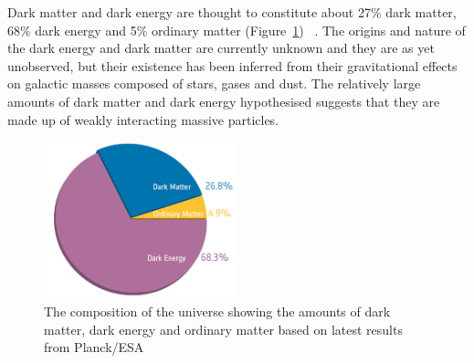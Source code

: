Dark matter and dark energy are thought to constitute about 27\% dark matter, 68\% dark energy and 5\%
ordinary matter (Figure~\ref{fig:universe_composition}) ~\cite{Ade:2013sjv}. The origins and nature of the
dark energy and dark matter are currently unknown and they are as yet unobserved, but their existence has been
inferred from their gravitational effects on galactic masses composed of stars, gases and dust. The relatively
large amounts of dark matter and dark energy hypothesised suggests that they are made up of weakly interacting
massive particles.

\begin{figure}[hbtp]
   \centering
     \includegraphics[width=0.5\textwidth]{Chapters/03_Theory/Images/planck_cosmic_pie}\hfill
     \caption[The composition of the universe showing the amounts of dark matter, dark energy and ordinary
     matter.]{The composition of the universe showing the amounts of dark matter, dark energy and ordinary
     matter based on latest results from Planck/ESA~\cite{Ade:2013sjv}}
     \label{fig:universe_composition}
\end{figure}